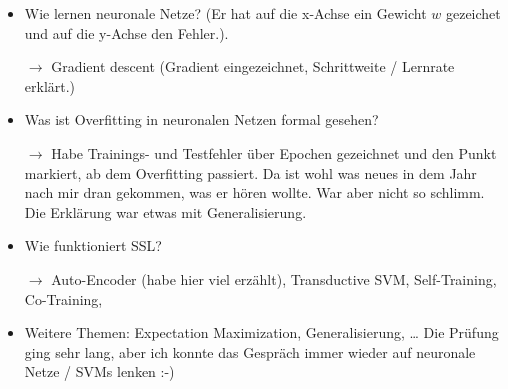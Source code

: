 \documentclass[a4paper]{article}
\begin{document}
\begin{itemize}
    \item Wie lernen neuronale Netze? (Er hat auf die x-Achse ein Gewicht $w$
          gezeichet und auf die y-Achse den Fehler.).
    \item[$\rightarrow$] Gradient descent (Gradient eingezeichnet, Schrittweite / Lernrate erklärt.)
    \item Was ist Overfitting in neuronalen Netzen formal gesehen?
    \item[$\rightarrow$] Habe Trainings- und Testfehler über Epochen gezeichnet
                         und den Punkt markiert, ab dem Overfitting passiert.
                         Da ist wohl was neues in dem Jahr nach mir dran
                         gekommen, was er hören wollte. War aber nicht so
                         schlimm. Die Erklärung war etwas mit Generalisierung.
    \item Wie funktioniert SSL?
    \item[$\rightarrow$] Auto-Encoder (habe hier viel erzählt),
                         Transductive SVM, Self-Training, Co-Training,
    \item Weitere Themen: Expectation Maximization, Generalisierung, \dots
          Die Prüfung ging sehr lang, aber ich konnte das Gespräch immer wieder
          auf neuronale Netze / SVMs lenken :-)
\end{itemize}
\end{document}
